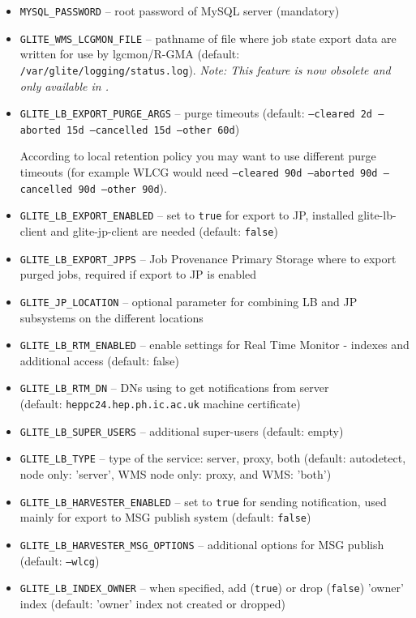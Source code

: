 \begin{itemize}
\item \texttt{MYSQL\_PASSWORD} -- root password of MySQL server (mandatory)
\item \texttt{GLITE\_WMS\_LCGMON\_FILE} -- pathname of file where job state
export data are written for use by lgcmon/R-GMA 
(default: \texttt{/var/glite/logging/status.log}). \emph{Note: This feature is now obsolete and only available in .}
\item \texttt{GLITE\_LB\_EXPORT\_PURGE\_ARGS} -- purge timeouts (default: \texttt{--cleared 2d --aborted 15d --cancelled 15d --other 60d})

According to local retention policy you may want to use different purge timeouts (for example WLCG would need \texttt{--cleared 90d --aborted 90d --cancelled 90d --other 90d}).
\item \texttt{GLITE\_LB\_EXPORT\_ENABLED} -- set to \texttt{true} for export to JP, installed glite-lb-client and glite-jp-client are needed (default: \texttt{false})
\item \texttt{GLITE\_LB\_EXPORT\_JPPS} -- Job Provenance Primary Storage where to export purged jobs, required if export to JP is enabled
\item \texttt{GLITE\_JP\_LOCATION} -- optional parameter for combining LB and JP subsystems on the different locations
\item \texttt{GLITE\_LB\_RTM\_ENABLED} -- enable settings for Real Time Monitor - indexes and additional access (default: false)
\item \texttt{GLITE\_LB\_RTM\_DN} -- DNs using to get notifications from \LB server\\
(default: \texttt{heppc24.hep.ph.ic.ac.uk} machine certificate)
\item \texttt{GLITE\_LB\_SUPER\_USERS} -- additional super-users (default: empty)
\item \texttt{GLITE\_LB\_TYPE} -- type of the \LB service: server, proxy, both (default: autodetect, \LB node only: 'server', WMS node only: proxy, \LB and WMS: 'both')
\item \texttt{GLITE\_LB\_HARVESTER\_ENABLED} -- set to \texttt{true} for sending notification, used mainly for export to MSG publish system (default: \texttt{false})
\item \texttt{GLITE\_LB\_HARVESTER\_MSG\_OPTIONS} -- additional options for MSG publish (default: \texttt{--wlcg})
\item \texttt{GLITE\_LB\_INDEX\_OWNER} -- when specified, add (\texttt{true}) or drop (\texttt{false}) 'owner' index (default: 'owner' index not created or dropped)
\end{itemize}

